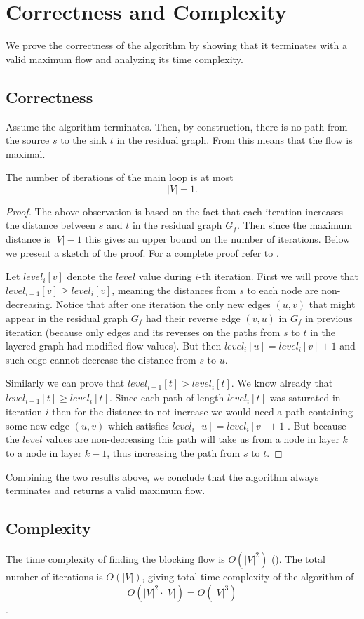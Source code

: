 \section{Correctness and Complexity}

We prove the correctness of the algorithm by showing that it terminates with a valid maximum flow and analyzing its time complexity.

\subsection*{Correctness}

Assume the algorithm terminates. Then, by construction, there is no path from the source $s$ to the sink $t$ in the residual graph. From  this means that the flow is maximal.

\begin{lemma}
The number of iterations of the main loop is at most $$|V| - 1.$$
\end{lemma}
\begin{proof}
The above observation is based on the fact that each iteration increases the distance between $s$ and $t$ in the residual graph $G_f$. Then since the maximum distance is $|V|-1$ this gives an upper bound on the number of iterations. Below we present a sketch of the proof. For a complete proof refer to \cite{even1976}.

Let $level_i[v]$ denote the $level$ value during $i$-th iteration. First we will prove that $level_{i+1}[v] \geq level_{i}[v] $, meaning the distances from $s$ to each node are non-decreasing.
Notice that after one iteration the only new edges $(u,v)$ that might appear in the residual graph $G_f$ had their reverse edge $(v,u)$ in $G_f$ in previous iteration (because only edges and its reverses on the paths from $s$ to $t$ in the layered graph had modified flow values). But then $level_i[u] = level_i[v]+1$ and such edge cannot decrease the distance from $s$ to $u$.

Similarly we can prove that $level_{i+1}[t] > level_{i}[t]$. We know already that $level_{i+1}[t] \geq level_{i}[t]$. Since each path of length $level_{i}[t]$ was saturated in iteration $i$ then for the distance to not increase we would need a path containing some new edge $(u,v)$ which satisfies $level_i[u] = level_i[v]+1$ . But because the $level$ values are non-decreasing this path will take us from a node in layer $k$ to a node in layer $k-1$, thus increasing the path from $s$ to $t$.
\end{proof}


Combining the two results above, we conclude that the algorithm always terminates and returns a valid maximum flow.

\subsection*{Complexity}

The time complexity of finding the blocking flow is $O(|V|^2)$ (). The total number of iterations is $O(|V|)$,
giving total time complexity of the algorithm of 
$$ O(|V|^2 \cdot |V|) = O(|V|^3)$$.